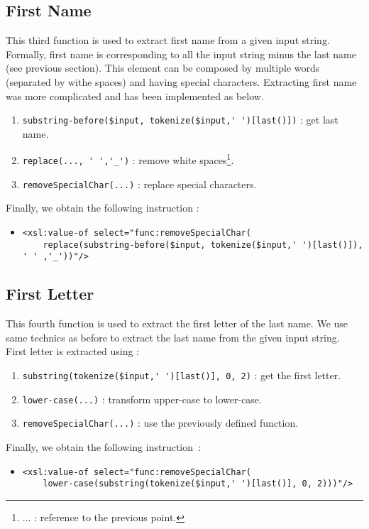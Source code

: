 \documentclass{article}
\begin{document}
\subsection{First Name} 
This third function is used to extract first name from a given input string. Formally, first name is corresponding to all the input string minus the last name (see previous section). This element can be composed by multiple words (separated by withe spaces) and having special characters. Extracting first name was more complicated and has been implemented as below.
\begin{enumerate}
\item \verb|substring-before($input, tokenize($input,' ')[last()])| : get last name.
\item \verb|replace(..., ' ','_')| : remove white spaces\footnote{ ... : reference to the previous point.}.
\item \verb|removeSpecialChar(...)| : replace special characters.
\end{enumerate}
Finally, we obtain the following instruction :
\begin{itemize}
\item \begin{verbatim} 
<xsl:value-of select="func:removeSpecialChar(
    replace(substring-before($input, tokenize($input,' ')[last()]), ' ' ,'_'))"/>
\end{verbatim}
\end{itemize}

\subsection{First Letter}
This fourth function is used to extract the first letter of the last name. We use same technics as before to extract the last name from the given input string. First letter is extracted using : 
\begin{enumerate}
\item \verb|substring(tokenize($input,' ')[last()], 0, 2)| : get the first letter.
\item \verb|lower-case(...)| : transform upper-case to lower-case.
\item \verb|removeSpecialChar(...)| : use the previously defined function.
\end{enumerate}
Finally, we obtain the following instruction~:
\begin{itemize}
\item \begin{verbatim}
<xsl:value-of select="func:removeSpecialChar(
    lower-case(substring(tokenize($input,' ')[last()], 0, 2)))"/>
\end{verbatim}
\end{itemize}
\end{document}

